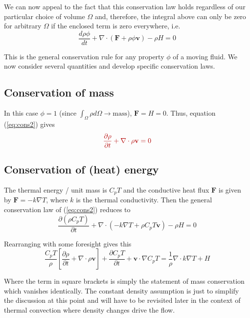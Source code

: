 \documentclass[10pt]{article}
\begin{document}
We can now appeal to the fact that this conservation law
holds regardless of our particular choice of volume $\Omega$ and, therefore,
the integral above can only be zero for arbitrary $\Omega$ if the enclosed
term is zero everywhere, i.e.	
	\begin{equation}
		\frac{d \rho \phi}{dt} + 
			\nabla \cdot (\mathbf{F} + \rho \phi \mathbf{v}) 
			-\rho H =0
			\label{eq:cons2}
	\end{equation}
		
	This is the general conservation rule for any property $\phi$ of a moving
fluid. We now consider several quantities and develop specific conservation
laws.	
		
\subsection{Conservation of mass}
	
In this case $\phi=1$ (since $\int_\Omega \rho d\Omega \rightarrow \mbox{mass}$), $\mathbf{F} = H = 0$.
	Thus, equation (\ref{eq:cons2}) gives	
		\begin{equation}
			\Red{\frac{\partial \rho}{\partial t} + 
				\nabla \cdot \rho \mathbf{v} = 0}
			\label{eq:masscons}
		\end{equation}
		
\subsection{Conservation of (heat) energy}
	
	The thermal energy / unit mass is $C_p T$ and the conductive heat flux
$\mathbf{F}$ is given by $ \mathbf{F} = -k \nabla T$, where $k$ is the thermal
conductivity. Then the general conservation law of (\ref{eq:cons2}) reduces to
	\begin{equation}
		\frac{\partial (\rho C_p T)}{\partial t} +
			 \nabla \cdot \left(-k \nabla T + 
			 \rho C_p T \mathbf{v}\right) - \rho H = 0
	\end{equation}
		
Rearranging with some foresight gives this
		\begin{equation}	
			\frac{C_p T}{\rho} \left[ \frac{\partial \rho}{\partial t} + 
			\nabla \cdot \rho \mathbf{v} \right] + 
			\frac{\partial C_p T}{\partial t} + 
			\mathbf{v} \cdot \nabla C_p T = 
			\frac{1}{\rho} \nabla \cdot k \nabla T + H
		\end{equation}
	
Where the term in square brackets is simply the statement of mass conservation
which vanishes identically. The constant density assumption is just to simplify the discussion at this point and will have to be
revisited later in the context of thermal convection where density changes
drive the flow.
	
\end{document}
